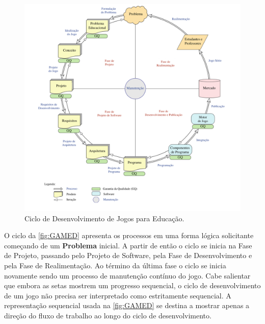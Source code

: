 \pagebreak

\begin{figure}[htb]

	\caption{\label{fig:GAMED}Ciclo de Desenvolvimento de Jogos para Educação.}
  \begin{center}%
    \includegraphics[width=1.05\linewidth]{./Figuras/GAMED.pdf}
	\end{center}%

\end{figure}

O ciclo da \autoref{fig:GAMED} apresenta os processos em uma forma lógica solicitante começando de um \textbf{Problema} inicial. A partir de então o ciclo se inicia na Fase de Projeto, passando pelo Projeto de Software, pela Fase de Desenvolvimento e pela Fase de Realimentação. Ao término da última fase o ciclo se inicia novamente sendo um processo de manutenção contínuo do jogo. Cabe salientar que embora as setas mostrem um progresso sequencial, o ciclo de desenvolvimento de um jogo não precisa ser interpretado como estritamente sequencial. A representação sequencial usada na \autoref{fig:GAMED} se destina a mostrar apenas a direção do fluxo de trabalho ao longo do ciclo de desenvolvimento. 

